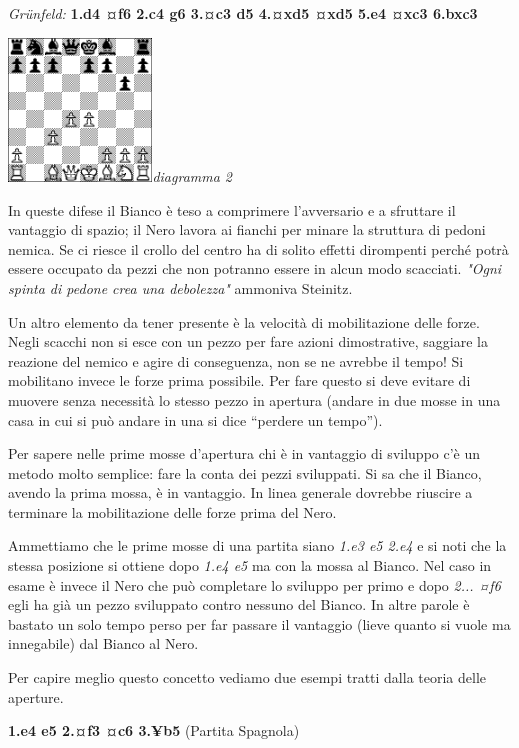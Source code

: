 \documentclass[
]{article}
\begin{document}
\emph{Grünfeld:} \textbf{1.d4 ¤f6 2.c4 g6 3.¤c3 d5 4.¤xd5 ¤xd5 5.e4 ¤xc3
6.bxc3}

\includegraphics[width=1.50417in,height=1.50417in]{vertopal_109f12be458a423d8f3cc838880eaea2/media/image2.png}\emph{diagramma
2}

In queste difese il Bianco è teso a comprimere l'avversario e a
sfruttare il vantaggio di spazio; il Nero lavora ai fianchi per minare
la struttura di pedoni nemica. Se ci riesce il crollo del centro ha di
solito effetti dirompenti perché potrà essere occupato da pezzi che non
potranno essere in alcun modo scacciati. \emph{"Ogni spinta di pedone
crea una debolezza"} ammoniva Steinitz.

Un altro elemento da tener presente è la velocità di mobilitazione delle
forze. Negli scacchi non si esce con un pezzo per fare azioni
dimostrative, saggiare la reazione del nemico e agire di conseguenza,
non se ne avrebbe il tempo! Si mobilitano invece le forze prima
possibile. Per fare questo si deve evitare di muovere senza necessità lo
stesso pezzo in apertura (andare in due mosse in una casa in cui si può
andare in una si dice ``perdere un tempo'').

Per sapere nelle prime mosse d'apertura chi è in vantaggio di sviluppo
c'è un metodo molto semplice: fare la conta dei pezzi sviluppati. Si sa
che il Bianco, avendo la prima mossa, è in vantaggio. In linea generale
dovrebbe riuscire a terminare la mobilitazione delle forze prima del
Nero.

Ammettiamo che le prime mosse di una partita siano \emph{1.e3 e5 2.e4} e
si noti che la stessa posizione si ottiene dopo \emph{1.e4 e5} ma con la
mossa al Bianco. Nel caso in esame è invece il Nero che può completare
lo sviluppo per primo e dopo \emph{2... ¤f6} egli ha già un pezzo
sviluppato contro nessuno del Bianco. In altre parole è bastato un solo
tempo perso per far passare il vantaggio (lieve quanto si vuole ma
innegabile) dal Bianco al Nero.

Per capire meglio questo concetto vediamo due esempi tratti dalla teoria
delle aperture.

\textbf{1.e4 e5 2.¤f3 ¤c6 3.¥b5} (Partita Spagnola)
\end{document}
